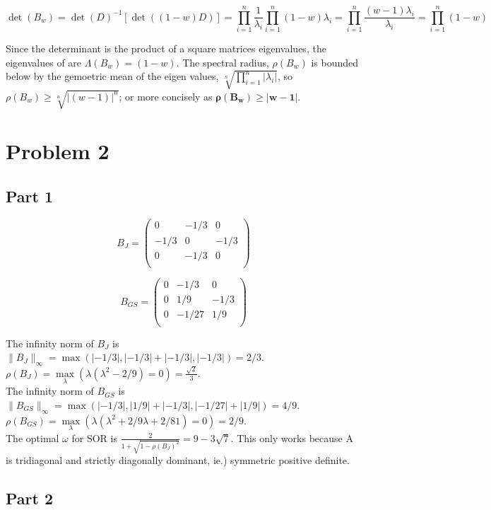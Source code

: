 \documentclass{article}
\begin{document}
$$\det(B_w) = \det(D)^{-1}[\det((1-w)D)] = \prod_{i=1}^{n} \frac{1}{\lambda_i} \prod_{i=1}^{n} (1-w)\lambda_i = \prod_{i=1}^{n}\frac{(w-1)\lambda_i}{\lambda_i} = \prod_{i=1}^{n} (1-w)$$

\noindent Since the determinant is the product of a square matrices eigenvalues, the eigenvalues of are $\Lambda(B_w)=(1-w)$.
The spectral radius, $\rho(B_w)$ is bounded below by the gemoetric mean of the eigen values, $\sqrt[n]{\prod_{i=1}^{n}|\lambda_i|}$,
so $\rho(B_w) \ge \sqrt[n]{|(w-1)|^n}$; or more concisely as $\mathbf{\rho(B_w) \ge |w-1|}$.

\section*{Problem 2}

\subsection*{Part 1}

$$B_J = \begin{pmatrix}
    0 & -1/3 & 0 \\ -1/3 & 0 & -1/3 \\ 0 & -1/3 & 0\\
\end{pmatrix}$$

$$B_{GS} = \begin{pmatrix} 
    0 & -1/3 & 0 \\ 0 & 1/9 & -1/3 \\ 0 & -1/27 & 1/9 \\
\end{pmatrix}$$

\noindent The infinity norm of $B_J$ is $\|B_J\|_{\infty} = \max(|-1/3|, |-1/3|+|-1/3|, |-1/3|)=2/3$. $\rho(B_J) = \max\limits_\lambda(\lambda (\lambda^2-2/9)=0)=\frac{\sqrt{2}}{3}$.\\
\noindent The infinity norm of $B_{GS}$ is $\|B_{GS}\|_\infty = \max(|-1/3|, |1/9|+|-1/3|,|-1/27|+|1/9|)=4/9$. $\rho(B_{GS})=\max\limits_\lambda (\lambda(\lambda^2+2/9\lambda+2/81)=0)=2/9$.\\

\noindent The optimal $\omega$ for SOR is $\frac{2}{1+\sqrt{1-\rho(B_J)^2}}=9-3\sqrt{7}$. This only works because A is tridiagonal and strictly diagonally dominant, ie.) symmetric positive definite.\\

\subsection*{Part 2}
\end{document}

